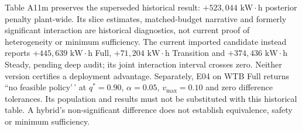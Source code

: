 \documentclass[
  journal]{IEEEtran}
\begin{document}
Table A11m preserves the superseded historical result:
\(+523{,}044\text{ kW}\cdot\text{h}\) posterior penalty plant-wide. Its
slice estimates, matched-budget narrative and formerly significant
interaction are historical diagnostics, not current proof of
heterogeneity or minimum sufficiency. The current imported candidate
instead reports \(+445{,}639\text{ kW}\cdot\text{h}\) Full,
\(+71{,}204\text{ kW}\cdot\text{h}\) Transition and
\(+374{,}436\text{ kW}\cdot\text{h}\) Steady, pending deep audit; its
joint interaction interval crosses zero. Neither version certifies a
deployment advantage. Separately, E04 on WTB Full returns ``no feasible
policy'\,' at \(q^*=0.90\), \(\alpha=0.05\), \(v_{\max}=0.10\) and zero
difference tolerances. Its population and results must not be
substituted with this historical table. A hybrid's non-significant
difference does not establish equivalence, safety or minimum
sufficiency.
\end{document}

